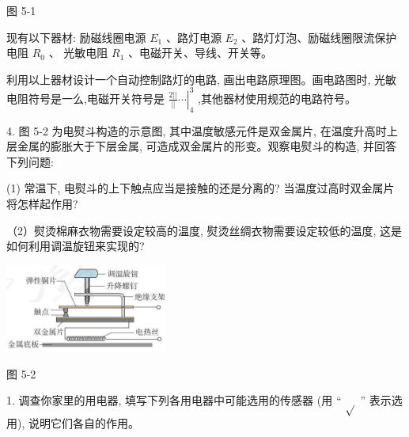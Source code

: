 \documentclass[10pt]{article}
\begin{document}
图 5-1

现有以下器材: 励磁线圈电源 \({E}_{1}\) 、路灯电源 \({E}_{2}\) 、路灯灯泡、励磁线圈限流保护电阻 \({R}_{0}\) 、 光敏电阻 \({R}_{1}\) 、电磁开关、导线、开关等。

利用以上器材设计一个自动控制路灯的电路, 画出电路原理图。画电路图时, 光敏电阻符号是一么,电磁开关符号是 \({\left. \frac{2\left| \right| }{\left| \right| }\cdots \right| }_{4}^{3}\) ,其他器材使用规范的电路符号。

4. 图 5-2 为电熨斗构造的示意图, 其中温度敏感元件是双金属片, 在温度升高时上层金属的膨胀大于下层金属, 可造成双金属片的形变。观察电熨斗的构造, 并回答下列问题:

(1) 常温下, 电熨斗的上下触点应当是接触的还是分离的? 当温度过高时双金属片将怎样起作用?

（2）熨烫棉麻衣物需要设定较高的温度, 熨烫丝绸衣物需要设定较低的温度, 这是如何利用调温旋钮来实现的?

\begin{center}
\includegraphics[max width=0.4\textwidth]{images/01910e72-c5b7-7ed5-a6d4-fb3a5faefc32_113_985275.jpg}
\end{center}

图 5-2

1. 调查你家里的用电器, 填写下列各用电器中可能选用的传感器 (用 “ \(\sqrt{}\) ” 表示选用), 说明它们各自的作用。

\begin{center}
\end{center}
\end{document}
